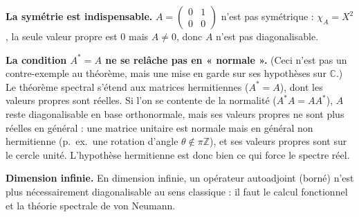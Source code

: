 
\begin{mdframed}[style=cexbar]
  \textbf{La symétrie est indispensable.}\enspace%
  $A = \begin{pmatrix}0&1\\0&0\end{pmatrix}$ n'est pas symétrique :
  $\chi_A = X^2$, la seule valeur propre est $0$ mais $A\neq 0$, donc $A$
  n'est pas diagonalisable.

  \smallskip\noindent
  \textbf{La condition $A^*=A$ ne se relâche pas en « normale ».}\enspace%
  (Ceci n'est pas un contre-exemple au théorème, mais une mise en garde sur
  ses hypothèses sur $\mathbb{C}$.) Le théorème spectral s'étend aux matrices
  hermitiennes ($A^* = A$), dont les valeurs propres sont réelles. Si l'on se
  contente de la normalité ($A^*A = AA^*$), $A$ reste diagonalisable en base
  orthonormale, mais ses valeurs propres ne sont plus réelles en général :
  une matrice unitaire est normale mais en général non hermitienne
  (p.~ex.\ une rotation d'angle $\theta \notin \pi\mathbb{Z}$), et ses valeurs
  propres sont sur le cercle unité. L'hypothèse hermitienne est donc bien ce qui force
  le spectre réel.

  \smallskip\noindent
  \textbf{Dimension infinie.}\enspace%
  En dimension infinie, un opérateur autoadjoint (borné) n'est plus
  nécessairement diagonalisable au sens classique : il faut le calcul
  fonctionnel et la théorie spectrale de von Neumann.
\end{mdframed}

\vspace{6pt}
\exolabel

